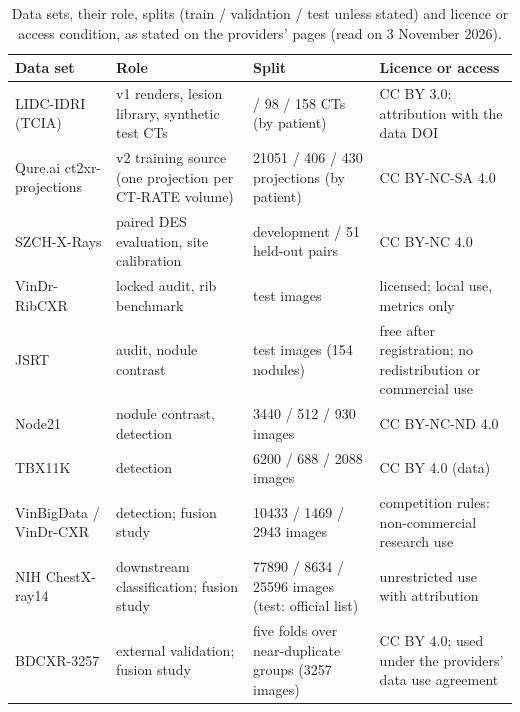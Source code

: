 \begin{table}[!t]
\centering
\caption{Data sets, their role, splits (train / validation / test unless stated) and licence or access condition, as stated on the
providers' pages (read on 3 November 2026).}
\label{tab:data}
\footnotesize
\renewcommand{\arraystretch}{1.08}
\begin{tabularx}{\textwidth}{@{}>{\raggedright\arraybackslash}p{3.1cm}>{\raggedright\arraybackslash}p{4.4cm}%
>{\raggedright\arraybackslash}p{4.2cm}>{\raggedright\arraybackslash}X@{}}
\toprule
Data set & Role & Split & Licence or access \\
\midrule
LIDC-IDRI (TCIA) & v1 renders, lesion library, synthetic test CTs & 588 / 98 / 158 CTs (by patient) & CC BY 3.0; attribution with the data DOI \\
Qure.ai ct2xr-projections & v2 training source (one projection per CT-RATE volume) & \num{21051} / 406 / 430 projections (by patient) & CC BY-NC-SA 4.0 \\
SZCH-X-Rays & paired DES evaluation, site calibration & 24 development / 51 held-out pairs & CC BY-NC 4.0 \\
VinDr-RibCXR & locked audit, rib benchmark & 245 test images & licensed; local use, metrics only \\
JSRT & audit, nodule contrast & 247 test images (154 nodules) & free after registration; no redistribution or commercial use \\
Node21 & nodule contrast, detection & \num{3440} / 512 / 930 images & CC BY-NC-ND 4.0 \\
TBX11K & detection & \num{6200} / 688 / \num{2088} images & CC BY 4.0 (data) \\
VinBigData / VinDr-CXR & detection; fusion study & \num{10433} / \num{1469} / \num{2943} images & competition rules: non-commercial research use \\
NIH ChestX-ray14 & downstream classification; fusion study & \num{77890} / \num{8634} / \num{25596} images (test: official list) & unrestricted use with attribution \\
BDCXR-3257 & external validation; fusion study & five folds over near-duplicate groups (\num{3257} images) & CC BY 4.0; used under the providers' data use agreement \\
\bottomrule
\end{tabularx}
\end{table}

